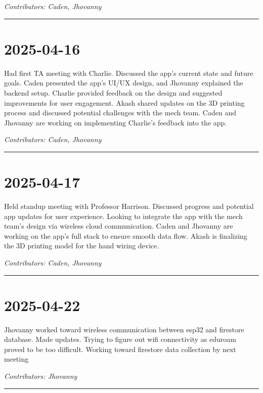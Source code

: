 \documentclass[12pt]{article}
\begin{document}
\vspace{1em}
\noindent\textit{Contributors: Caden, Jhovanny}
\vspace{1em}
\hrule

\section*{2025-04-16}
Had first TA meeting with Charlie. Discussed the app's current state and future goals. Caden presented the app's UI/UX design, and Jhovanny explained the backend setup. Charlie provided feedback on the design and suggested improvements for user engagement. Akash shared updates on the 3D printing process and discussed potential challenges with the mech team.
Caden and Jhovanny are working on implementing Charlie's feedback into the app. 

\vspace{1em}
\noindent\textit{Contributors: Caden, Jhovanny}
\vspace{1em}
\hrule

\section*{2025-04-17}
Held standup meeting with Professor Harrison. Discussed progress and potential app updates for user experience. Looking to integrate the app with the mech team's design via wireless cloud communication. Caden and Jhovanny are working on the app's full stack to ensure smooth data flow. Akash is finalizing the 3D printing model for the hand wiring device.

\vspace{1em}
\noindent\textit{Contributors: Caden, Jhovanny}
\vspace{1em}
\hrule

\section*{2025-04-22}
Jhovanny worked toward wireless communication between esp32 and firestore database. Made updates. Trying to figure out wifi connectivity as eduroam proved to be too difficult. Working toward firestore data collection by next meeting

\vspace{1em}
\noindent\textit{Contributors: Jhovanny}
\vspace{1em}
\hrule
\end{document}
